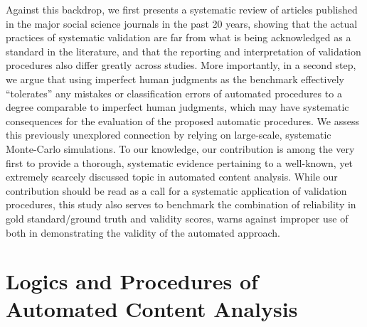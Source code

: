 \documentclass[man, 12pt, a4paper, nolmodern, noextraspace]{apa6}
\begin{document}
    Against this backdrop, we first presents a systematic review of articles published in the major social science journals in the past 20 years, showing that the actual practices of systematic validation are far from what is being acknowledged as a standard in the literature, and that the reporting and interpretation of validation procedures also differ greatly across studies. More importantly, in a second step, we argue that using imperfect human judgments as the benchmark effectively \enquote{tolerates} any mistakes or classification errors of automated procedures to a degree comparable to imperfect human judgments, which may have systematic consequences for the evaluation of the proposed automatic procedures. We assess this previously unexplored connection by relying on large-scale, systematic Monte-Carlo simulations. To our knowledge, our contribution is among the very first to provide a thorough, systematic evidence pertaining to a well-known, yet extremely scarcely discussed topic in automated content analysis. While our contribution should be read as a call for a systematic application of validation procedures, this study also serves to benchmark the combination of reliability in gold standard/ground truth and validity scores, warns against improper use of both in demonstrating the validity of the automated approach. 
    
\section{Logics and Procedures of Automated Content Analysis}
\end{document}
